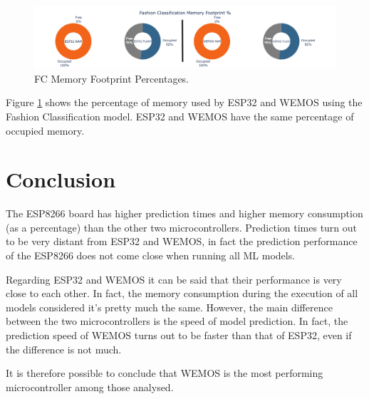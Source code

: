 \documentclass{article}
\begin{document}
\begin{figure}[H]
    \centering
    \includegraphics[width=1.0\textwidth]{FC-Mem-perc.png}
    \caption{FC Memory Footprint Percentages.}
    \label{fig:17}
\end{figure}

Figure \ref{fig:17} shows the percentage of memory used by ESP32 and WEMOS using the Fashion Classification model. ESP32 and WEMOS have the same percentage of occupied memory.

\section{Conclusion}

The ESP8266 board has higher prediction times and higher memory consumption (as a percentage) than the other two microcontrollers. Prediction times turn out to be very distant from ESP32 and WEMOS, in fact the prediction performance of the ESP8266 does not come close when running all ML models. 

Regarding ESP32 and WEMOS it can be said that their performance is very close to each other. In fact, the memory consumption during the execution of all models considered it's pretty much the same. However, the main difference between the two microcontrollers is the speed of model prediction. In fact, the prediction speed of WEMOS turns out to be faster than that of ESP32, even if the difference is not much.

It is therefore possible to conclude that WEMOS is the most performing microcontroller among those analysed.
\end{document}
